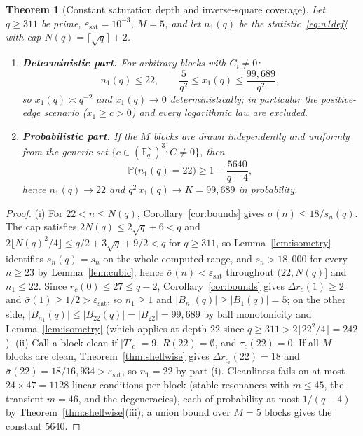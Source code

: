 \documentclass[11pt,a4paper]{article}
\theoremstyle{plain}
\newtheorem{theorem}{Theorem}
\theoremstyle{definition}
\newcommand{\epssat}{\varepsilon_{\mathrm{sat}}}
\newcommand{\xone}{x_1}
\newcommand{\none}{n_1}
\newcommand{\Tp}{T'_c}
\begin{document}
    \begin{theorem}[Constant saturation depth and inverse-square coverage]
      \label{thm:main}
      Let $q\ge311$ be prime, $\epssat = 10^{-3}$, $M = 5$, and let $\none(q)$ be the
      statistic~\eqref{eq:n1def} with cap $N(q) = \lceil\sqrt{q}\rceil + 2$.
      \begin{enumerate}[nosep]
        \item \textbf{Deterministic part.}
          For arbitrary blocks with $C_i \ne 0$:
          \begin{equation}
            \none(q) \le 22,
            \qquad
            \frac{5}{q^2} \le \xone(q) \le \frac{99{,}689}{q^2},
          \end{equation}
          so $\xone(q) \asymp q^{-2}$ and $\xone(q) \to 0$ deterministically; in particular the
          positive-edge scenario ($\xone \ge c > 0$) and every logarithmic law are excluded.
        \item \textbf{Probabilistic part.}
          If the $M$ blocks are drawn independently and uniformly from the generic set
          $\{c \in (\mathbb{F}_q^{\times})^3 : C \ne 0\}$, then
          \begin{equation}
            \mathbb{P}\bigl(\none(q) = 22\bigr) \ge 1 - \frac{5640}{q-4},
          \end{equation}
          hence $\none(q) \to 22$ and $q^2\,\xone(q) \to K = 99{,}689$ in probability.
      \end{enumerate}
    \end{theorem}

    \begin{proof}
      (i) For $22 < n \le N(q)$, Corollary~\ref{cor:bounds} gives
      $\bar\sigma(n) \le 18/s_n(q)$.
      The cap satisfies $2N(q) \le 2\sqrt q+6<q$ and
      $2\lfloor N(q)^2/4\rfloor \le q/2+3\sqrt q+9/2<q$ for $q \ge 311$, so
      Lemma~\ref{lem:isometry} identifies $s_n(q) = s_n$ on the whole computed range, and
      $s_n > 18{,}000$ for every $n \ge 23$ by Lemma~\ref{lem:cubic}; hence
      $\bar\sigma(n) < \epssat$ throughout $(22, N(q)]$ and $\none \le 22$.
      Since $r_c(0) \le 27 \le q-2$, Corollary~\ref{cor:bounds} gives $\Delta r_c(1) \ge 2$ and
      $\bar\sigma(1) \ge 1/2 > \epssat$, so $\none \ge 1$ and
      $\lvert B_{\none}(q)\rvert \ge \lvert B_1(q)\rvert = 5$; on the other side,
      $\lvert B_{\none}(q)\rvert \le \lvert B_{22}(q)\rvert = \lvert B_{22}\rvert = 99{,}689$ by
      ball monotonicity and Lemma~\ref{lem:isometry} (which applies at depth $22$ since
      $q \ge 311 > 2\lfloor 22^2/4 \rfloor = 242$).
      (ii) Call a block clean if $\lvert\Tp\rvert = 9$, $R(22) = \emptyset$, and
      $\tau_c(22) = 0$.
      If all $M$ blocks are clean, Theorem~\ref{thm:shellwise} gives $\Delta r_{c_i}(22) = 18$ and
      $\bar\sigma(22) = 18/16{,}934 > \epssat$, so $\none = 22$ by part (i).
      Cleanliness fails on at most $24 \times 47 = 1128$ linear conditions per block (stable
      resonances with $m \le 45$, the transient $m = 46$, and the degeneracies), each of
      probability at most $1/(q-4)$ by Theorem~\ref{thm:shellwise}(iii); a union bound over $M=5$
      blocks gives the constant $5640$.
    \end{proof}
\end{document}
